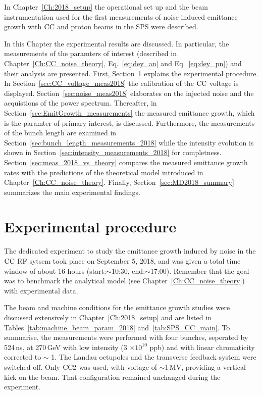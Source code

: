\vspace*{-1mm}
In Chapter~\ref{Ch:2018_setup} the operational set up and the beam instrumentation used for the first measurements of noise induced emittance growth with ${\mathrm{CC}}$ and proton beams in the SPS were described. 


In this Chapter the experimental results are discussed. In particular, the measurements of the paramters of interest (described in Chapter~\ref{Ch:CC_noise_theory}, Eq.~\eqref{eq:dey_an} and Eq.~\eqref{eq:dey_pn}) and their analysis are presented. First, Section~\ref{sec:experimental_procedure_2018} explains the experimental procedure.  In Section~\ref{sec:CC_voltage_meas2018} the calibration of the ${\mathrm{CC}}$ voltage is displayed. Section~\ref{sec:noise_meas2018} elaborates on the injected noise and the acquistions of the power spectrum. Thereafter, in Section~\ref{sec:EmitGrowth_measurements} the measured emittance growth, which is the paramter of primary interest, is discussed. Furthermore, the measurements of the bunch length are examined in Section~\ref{sec:bunch_length_measurements_2018} while the intensity evolution is shown in Section~\ref{sec:intensity_measurements_2018} for completness. Section~\ref{sec:meas_2018_vs_theory} compares the measured emittance growth rates with the predictions of the theoretical model introduced in Chapter~\ref{Ch:CC_noise_theory}. Finally, Section~\ref{sec:MD2018_summary} summarizes the main experimental findings.


\section{Experimental procedure}\label{sec:experimental_procedure_2018}

The dedicated experiment to study the emittance growth induced by noise in the ${\mathrm{CC}}$ RF sytsem took place on September 5, 2018, and was given a total time window of about 16 hours (start:$\sim$10:30, end:$\sim$17:00). Remember that the goal was to benchmark the analytical model (see Chapter~\ref{Ch:CC_noise_theory}) with experimental data.

The beam and machine conditions for the emittance growth studies were discussed extensively in Chapter~\ref{Ch:2018_setup} and are listed in Tables~\ref{tab:machine_beam_param_2018} and~\ref{tab:SPS_CC_main}. To summarise, the measurements were performed with four bunches, seperated by 524\,ns, at 270\,GeV with low intensity (3 $\times \mathrm{10^{10}}$ ppb) and with linear chromaticity corrected to $\sim$ 1. The Landau octupoles and the transverse feedback system were switched off. Only ${\mathrm{CC}}2$ was used, with voltage of $\sim$1\,MV, providing a vertical kick on the beam. That configuration remained unchanged during the experiment.

